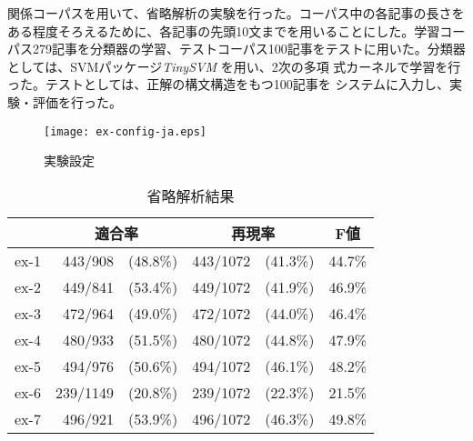 \documentclass{nlp}
\begin{document}
関係コーパスを用いて、省略解析の実験を行った。コーパス中の各記事の長さを
ある程度そろえるために、各記事の先頭10文までを用いることにした。学習コー
パス279記事を分類器の学習、テストコーパス100記事をテストに用いた。分類器
としては、SVMパッケージ\textit{TinySVM} \cite{TinySVM}を用い、2次の多項
式カーネルで学習を行った。テストとしては、正解の構文構造をもつ100記事を
システムに入力し、実験・評価を行った。

\begin{figure}[t]
 \begin{center}

  \vspace*{4ex}

  \texttt{[image: ex-config-ja.eps]}
  \caption{実験設定}
  \label{Figure::Configurations}
 \end{center}
\end{figure}

\begin{table}[t]
 \begin{center}
  \caption{省略解析結果}
  \label{Table::Result}
  \begin{tabular}{c||r@{ }r|r@{ }r|r} \hline
   & \multicolumn{2}{c|}{適合率} & \multicolumn{2}{c|}{再現率} &
   \multicolumn{1}{c}{F値} \\ \hline
   ex-1 & 443/908  & (48.8\%) & 443/1072 & (41.3\%) & 44.7\% \\
   ex-2 & 449/841  & (53.4\%) & 449/1072 & (41.9\%) & 46.9\% \\
   ex-3 & 472/964  & (49.0\%) & 472/1072 & (44.0\%) & 46.4\% \\
   ex-4 & 480/933  & (51.5\%) & 480/1072 & (44.8\%) & 47.9\% \\
   ex-5 & 494/976  & (50.6\%) & 494/1072 & (46.1\%) & 48.2\% \\
   ex-6 & 239/1149 & (20.8\%) & 239/1072 & (22.3\%) & 21.5\% \\
   ex-7 & 496/921  & (53.9\%) & 496/1072 & (46.3\%) & 49.8\% \\ \hline
  \end{tabular}
 \end{center}
\end{table}
\end{document}
